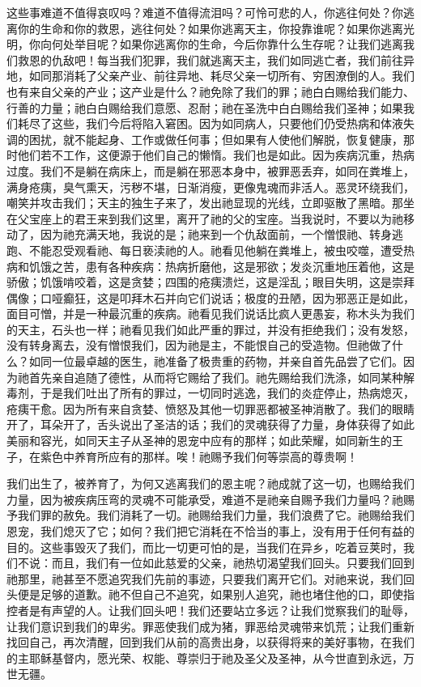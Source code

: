 这些事难道不值得哀叹吗？难道不值得流泪吗？可怜可悲的人，你逃往何处？你逃离你的生命和你的救恩，逃往何处？如果你逃离天主，你投靠谁呢？如果你逃离光明，你向何处举目呢？如果你逃离你的生命，今后你靠什么生存呢？让我们逃离我们救恩的仇敌吧！每当我们犯罪，我们就逃离天主，我们如同逃亡者，我们前往异地，如同那消耗了父亲产业、前往异地、耗尽父亲一切所有、穷困潦倒的人。我们也有来自父亲的产业；这产业是什么？祂免除了我们的罪；祂白白赐给我们能力、行善的力量；祂白白赐给我们意愿、忍耐；祂在圣洗中白白赐给我们圣神；如果我们耗尽了这些，我们今后将陷入窘困。因为如同病人，只要他们仍受热病和体液失调的困扰，就不能起身、工作或做任何事；但如果有人使他们解脱，恢复健康，那时他们若不工作，这便源于他们自己的懒惰。我们也是如此。因为疾病沉重，热病过度。我们不是躺在病床上，而是躺在邪恶本身中，被罪恶丢弃，如同在粪堆上，满身疮痍，臭气熏天，污秽不堪，日渐消瘦，更像鬼魂而非活人。恶灵环绕我们，嘲笑并攻击我们；天主的独生子来了，发出祂显现的光线，立即驱散了黑暗。那坐在父宝座上的君王来到我们这里，离开了祂的父的宝座。当我说时，不要以为祂移动了，因为祂充满天地，我说的是；祂来到一个仇敌面前，一个憎恨祂、转身逃跑、不能忍受观看祂、每日亵渎祂的人。祂看见他躺在粪堆上，被虫咬噬，遭受热病和饥饿之苦，患有各种疾病：热病折磨他，这是邪欲；发炎沉重地压着他，这是骄傲；饥饿啃咬着，这是贪婪；四围的疮痍溃烂，这是淫乱；眼目失明，这是崇拜偶像；口哑癫狂，这是叩拜木石并向它们说话；极度的丑陋，因为邪恶正是如此，面目可憎，并是一种最沉重的疾病。祂看见我们说话比疯人更愚妄，称木头为我们的天主，石头也一样；祂看见我们如此严重的罪过，并没有拒绝我们；没有发怒，没有转身离去，没有憎恨我们，因为祂是主，不能恨自己的受造物。但祂做了什么？如同一位最卓越的医生，祂准备了极贵重的药物，并亲自首先品尝了它们。因为祂首先亲自追随了德性，从而将它赐给了我们。祂先赐给我们洗涤，如同某种解毒剂，于是我们吐出了所有的罪过，一切同时逃逸，我们的炎症停止，热病熄灭，疮痍干愈。因为所有来自贪婪、愤怒及其他一切罪恶都被圣神消散了。我们的眼睛开了，耳朵开了，舌头说出了圣洁的话；我们的灵魂获得了力量，身体获得了如此美丽和容光，如同天主子从圣神的恩宠中应有的那样；如此荣耀，如同新生的王子，在紫色中养育所应有的那样。唉！祂赐予我们何等崇高的尊贵啊！\par

我们出生了，被养育了，为何又逃离我们的恩主呢？祂成就了这一切，也赐给我们力量，因为被疾病压弯的灵魂不可能承受，难道不是祂亲自赐予我们力量吗？祂赐予我们罪的赦免。我们消耗了一切。祂赐给我们力量，我们浪费了它。祂赐给我们恩宠，我们熄灭了它；如何？我们把它消耗在不恰当的事上，没有用于任何有益的目的。这些事毁灭了我们，而比一切更可怕的是，当我们在异乡，吃着豆荚时，我们不说：而且，我们有一位如此慈爱的父亲，祂热切渴望我们回头。只要我们回到祂那里，祂甚至不愿追究我们先前的事迹，只要我们离开它们。对祂来说，我们回头便是足够的道歉。祂不但自己不追究，如果别人追究，祂也堵住他的口，即使指控者是有声望的人。让我们回头吧！我们还要站立多远？让我们觉察我们的耻辱，让我们意识到我们的卑劣。罪恶使我们成为猪，罪恶给灵魂带来饥荒；让我们重新找回自己，再次清醒，回到我们从前的高贵出身，以获得将来的美好事物，在我们的主耶稣基督内，愿光荣、权能、尊崇归于祂及圣父及圣神，从今世直到永远，万世无疆。\par

